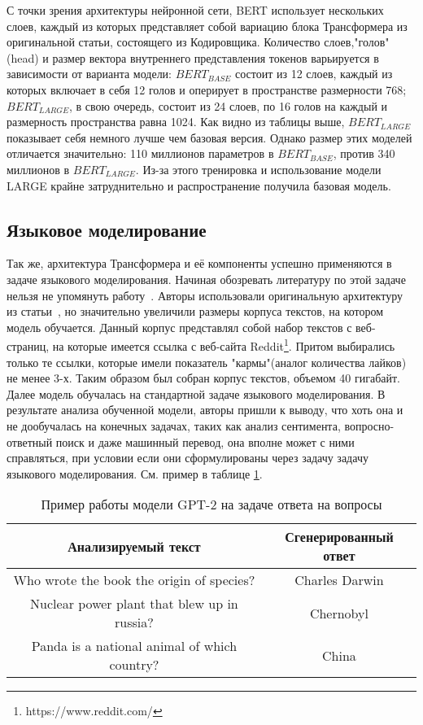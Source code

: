 \par С точки зрения архитектуры нейронной сети, BERT использует нескольких слоев, каждый из которых представляет собой вариацию блока Трансформера из оригинальной статьи, состоящего из Кодировщика. Количество слоев,"голов" (head) и размер вектора внутреннего представления токенов варьируется в зависимости от варианта модели: $BERT_{BASE}$ состоит из 12 слоев, каждый из которых включает в себя 12 голов и оперирует в пространстве размерности 768; $BERT_{LARGE}$, в свою очередь, состоит из 24 слоев, по 16 голов на каждый и размерность пространства равна 1024. Как видно из таблицы выше, $BERT_{LARGE}$ показывает себя немного лучше чем базовая версия. Однако размер этих моделей отличается значительно: 110 миллионов параметров в $BERT_{BASE}$, против 340 миллионов в $BERT_{LARGE}$. Из-за этого тренировка и использование модели LARGE крайне затруднительно и распространение получила базовая модель.
\subsection{Языковое моделирование}
\par Так же, архитектура Трансформера и её компоненты успешно применяются в задаче языкового моделирования. Начиная обозревать литературу по этой задаче нельзя не упомянуть работу~\cite{gpt2}. Авторы использовали оригинальную архитектуру из статьи~\cite{gpt1}, но значительно увеличили размеры корпуса текстов, на котором модель обучается. Данный корпус представлял собой набор текстов с веб-страниц, на которые имеется ссылка с веб-сайта Reddit\footnote{https://www.reddit.com/}. Притом выбирались только те ссылки, которые имели показатель "кармы"(аналог количества лайков) не менее 3-х. Таким образом был собран корпус текстов, объемом 40 гигабайт. Далее модель обучалась на стандартной задаче языкового моделирования. В результате анализа обученной модели, авторы пришли к выводу, что хоть она и не дообучалась на конечных задачах, таких как анализ сентимента, вопросно-ответный поиск и даже машинный перевод, она вполне может с ними справляться, при условии если они сформулированы через задачу задачу языкового моделирования.
См. пример в таблице \ref{gpt-qa}.

\begin{table}[H]
  \caption{Пример работы модели GPT-2 на задаче ответа на вопросы}\label{gpt-qa}
  \begin{tabular}{|c|c|}
  \hline
  Анализируемый текст & Сгенерированный ответ \\
  \hline
  Who wrote the book the origin of species? & Charles Darwin \\
  Nuclear power plant that blew up in russia? & Chernobyl \\
  Panda is a national animal of which country? & China \\
  \hline 
  \end{tabular}
\end{table}

